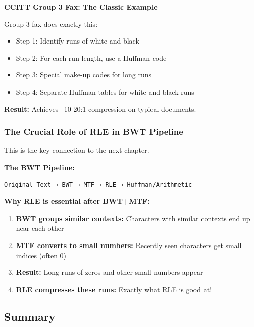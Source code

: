 \begin{examplebox}
\textbf{CCITT Group 3 Fax: The Classic Example}

Group 3 fax does exactly this:
\begin{itemize}
    \item Step 1: Identify runs of white and black
    \item Step 2: For each run length, use a Huffman code
    \item Step 3: Special make-up codes for long runs
    \item Step 4: Separate Huffman tables for white and black runs
\end{itemize}

\textbf{Result:} Achieves ~10-20:1 compression on typical documents.
\end{examplebox}

\subsubsection{The Crucial Role of RLE in BWT Pipeline}

This is the key connection to the next chapter.

\begin{importantbox}
\textbf{The BWT Pipeline:}

\begin{verbatim}
Original Text → BWT → MTF → RLE → Huffman/Arithmetic
\end{verbatim}

\textbf{Why RLE is essential after BWT+MTF:}

\begin{enumerate}
    \item \textbf{BWT groups similar contexts:} Characters with similar contexts end up near each other
    \item \textbf{MTF converts to small numbers:} Recently seen characters get small indices (often 0)
    \item \textbf{Result:} Long runs of zeros and other small numbers appear
    \item \textbf{RLE compresses these runs:} Exactly what RLE is good at!
\end{enumerate}
\end{importantbox}

\subsection{Summary}

